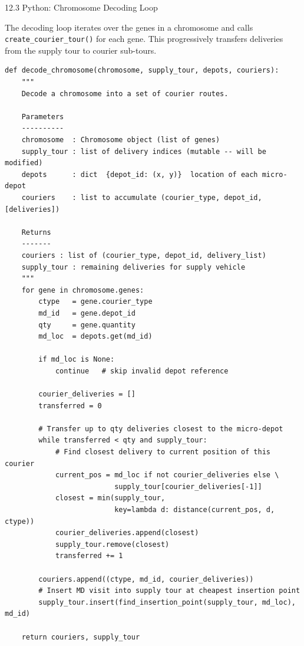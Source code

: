\documentclass[aspectratio=169,10pt]{beamer}
\begin{document}
\begin{frame}[fragile]{12.3 Python: Chromosome Decoding Loop}

The decoding loop iterates over the genes in a chromosome and
calls \texttt{create\_courier\_tour()} for each gene.
This progressively transfers deliveries from the supply tour
to courier sub-tours.

\begin{lstlisting}[caption={Chromosome decoding --- transfer deliveries to couriers}]
def decode_chromosome(chromosome, supply_tour, depots, couriers):
    """
    Decode a chromosome into a set of courier routes.

    Parameters
    ----------
    chromosome  : Chromosome object (list of genes)
    supply_tour : list of delivery indices (mutable -- will be modified)
    depots      : dict  {depot_id: (x, y)}  location of each micro-depot
    couriers    : list to accumulate (courier_type, depot_id, [deliveries])

    Returns
    -------
    couriers : list of (courier_type, depot_id, delivery_list)
    supply_tour : remaining deliveries for supply vehicle
    """
    for gene in chromosome.genes:
        ctype   = gene.courier_type
        md_id   = gene.depot_id
        qty     = gene.quantity
        md_loc  = depots.get(md_id)

        if md_loc is None:
            continue   # skip invalid depot reference

        courier_deliveries = []
        transferred = 0

        # Transfer up to qty deliveries closest to the micro-depot
        while transferred < qty and supply_tour:
            # Find closest delivery to current position of this courier
            current_pos = md_loc if not courier_deliveries else \
                          supply_tour[courier_deliveries[-1]]
            closest = min(supply_tour,
                          key=lambda d: distance(current_pos, d, ctype))
            courier_deliveries.append(closest)
            supply_tour.remove(closest)
            transferred += 1

        couriers.append((ctype, md_id, courier_deliveries))
        # Insert MD visit into supply tour at cheapest insertion point
        supply_tour.insert(find_insertion_point(supply_tour, md_loc), md_id)

    return couriers, supply_tour
\end{lstlisting}

\end{frame}
\end{document}
